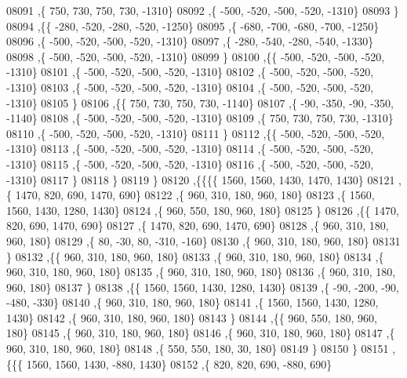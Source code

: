 \begin{DoxyCode}
08091     ,\{   750,   730,   750,   730, -1310\}
08092     ,\{  -500,  -520,  -500,  -520, -1310\}
08093     \}
08094    ,\{\{  -280,  -520,  -280,  -520, -1250\}
08095     ,\{  -680,  -700,  -680,  -700, -1250\}
08096     ,\{  -500,  -520,  -500,  -520, -1310\}
08097     ,\{  -280,  -540,  -280,  -540, -1330\}
08098     ,\{  -500,  -520,  -500,  -520, -1310\}
08099     \}
08100    ,\{\{  -500,  -520,  -500,  -520, -1310\}
08101     ,\{  -500,  -520,  -500,  -520, -1310\}
08102     ,\{  -500,  -520,  -500,  -520, -1310\}
08103     ,\{  -500,  -520,  -500,  -520, -1310\}
08104     ,\{  -500,  -520,  -500,  -520, -1310\}
08105     \}
08106    ,\{\{   750,   730,   750,   730, -1140\}
08107     ,\{   -90,  -350,   -90,  -350, -1140\}
08108     ,\{  -500,  -520,  -500,  -520, -1310\}
08109     ,\{   750,   730,   750,   730, -1310\}
08110     ,\{  -500,  -520,  -500,  -520, -1310\}
08111     \}
08112    ,\{\{  -500,  -520,  -500,  -520, -1310\}
08113     ,\{  -500,  -520,  -500,  -520, -1310\}
08114     ,\{  -500,  -520,  -500,  -520, -1310\}
08115     ,\{  -500,  -520,  -500,  -520, -1310\}
08116     ,\{  -500,  -520,  -500,  -520, -1310\}
08117     \}
08118    \}
08119   \}
08120  ,\{\{\{\{  1560,  1560,  1430,  1470,  1430\}
08121     ,\{  1470,   820,   690,  1470,   690\}
08122     ,\{   960,   310,   180,   960,   180\}
08123     ,\{  1560,  1560,  1430,  1280,  1430\}
08124     ,\{   960,   550,   180,   960,   180\}
08125     \}
08126    ,\{\{  1470,   820,   690,  1470,   690\}
08127     ,\{  1470,   820,   690,  1470,   690\}
08128     ,\{   960,   310,   180,   960,   180\}
08129     ,\{    80,   -30,    80,  -310,  -160\}
08130     ,\{   960,   310,   180,   960,   180\}
08131     \}
08132    ,\{\{   960,   310,   180,   960,   180\}
08133     ,\{   960,   310,   180,   960,   180\}
08134     ,\{   960,   310,   180,   960,   180\}
08135     ,\{   960,   310,   180,   960,   180\}
08136     ,\{   960,   310,   180,   960,   180\}
08137     \}
08138    ,\{\{  1560,  1560,  1430,  1280,  1430\}
08139     ,\{   -90,  -200,   -90,  -480,  -330\}
08140     ,\{   960,   310,   180,   960,   180\}
08141     ,\{  1560,  1560,  1430,  1280,  1430\}
08142     ,\{   960,   310,   180,   960,   180\}
08143     \}
08144    ,\{\{   960,   550,   180,   960,   180\}
08145     ,\{   960,   310,   180,   960,   180\}
08146     ,\{   960,   310,   180,   960,   180\}
08147     ,\{   960,   310,   180,   960,   180\}
08148     ,\{   550,   550,   180,    30,   180\}
08149     \}
08150    \}
08151   ,\{\{\{  1560,  1560,  1430,  -880,  1430\}
08152     ,\{   820,   820,   690,  -880,   690\}

\end{DoxyCode}

